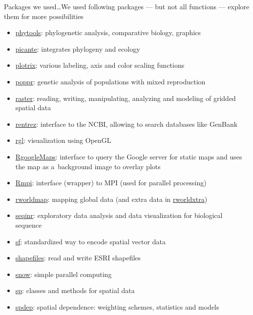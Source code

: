 \documentclass[compress, xelatex, 11pt, xcolor=svgnames, aspectratio=169, url={hyphens, lowtilde}]{beamer}
\begin{document}
\begin{frame}[allowframebreaks]{Packages we used\ldots}{We used following packages --- but not all functions --- explore them for more possibilities}
\begin{itemize}
		\item \href{https://CRAN.R-project.org/package=phytools}{phytools}: phylogenetic analysis, comparative biology, graphics
		\item \href{https://CRAN.R-project.org/package=picante}{picante}: integrates phylogeny and ecology
		\item \href{https://CRAN.R-project.org/package=plotrix}{plotrix}: various labeling, axis and color scaling functions
		\item \href{https://CRAN.R-project.org/package=poppr}{poppr}: genetic analysis of populations with mixed reproduction
		\item \href{https://CRAN.R-project.org/package=raster}{raster}: reading, writing, manipulating, analyzing and modeling of gridded spatial data
		\item \href{https://CRAN.R-project.org/package=rentrez}{rentrez}: interface to the NCBI, allowing to search databases like GenBank
		\item \href{https://CRAN.R-project.org/package=rgl}{rgl}: visualization using OpenGL
		\item \href{https://CRAN.R-project.org/package=RgoogleMaps}{RgoogleMaps}: interface to query the Google server for static maps and uses the map as a~background image to overlay plots
		\item \href{https://CRAN.R-project.org/package=Rmpi}{Rmpi}: interface (wrapper) to MPI (used for parallel processing)
		\item \href{https://CRAN.R-project.org/package=rworldmap}{rworldmap}: mapping global data (and extra data in \href{https://CRAN.R-project.org/package=rworldxtra}{rworldxtra})
		\item \href{https://CRAN.R-project.org/package=seqinr}{seqinr}: exploratory data analysis and data visualization for biological sequence
		\item \href{https://CRAN.R-project.org/package=sf}{sf}: standardized way to encode spatial vector data
		\item \href{https://CRAN.R-project.org/package=shapefiles}{shapefiles}: read and write ESRI shapefiles
		\item \href{https://CRAN.R-project.org/package=snow}{snow}: simple parallel computing
		\item \href{https://CRAN.R-project.org/package=sp}{sp}: classes and methods for spatial data
		\item \href{https://CRAN.R-project.org/package=spdep}{spdep}: spatial dependence: weighting schemes, statistics and models

\end{itemize}
\end{frame}
\end{document}
